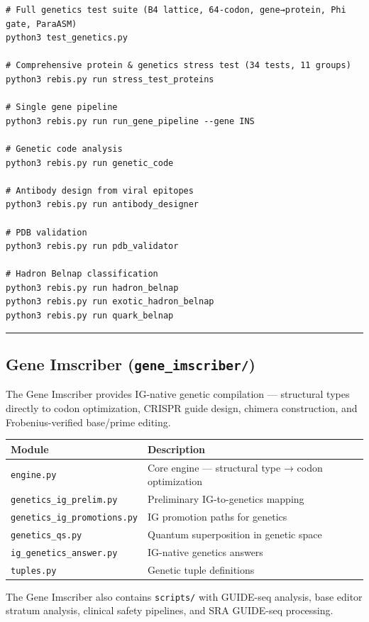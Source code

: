 \documentclass[12pt,a4paper]{article}
\begin{document}
\begin{verbatim}
# Full genetics test suite (B4 lattice, 64-codon, gene→protein, Phi gate, ParaASM)
python3 test_genetics.py

# Comprehensive protein & genetics stress test (34 tests, 11 groups)
python3 rebis.py run stress_test_proteins

# Single gene pipeline
python3 rebis.py run run_gene_pipeline --gene INS

# Genetic code analysis
python3 rebis.py run genetic_code

# Antibody design from viral epitopes
python3 rebis.py run antibody_designer

# PDB validation
python3 rebis.py run pdb_validator

# Hadron Belnap classification
python3 rebis.py run hadron_belnap
python3 rebis.py run exotic_hadron_belnap
python3 rebis.py run quark_belnap
\end{verbatim}

\begin{center}\rule{0.5\linewidth}{0.5pt}\end{center}

\hypertarget{gene-imscriber-gene_imscriber}{%
\subsection{\texorpdfstring{Gene Imscriber
(\texttt{gene\_imscriber/})}{Gene Imscriber (gene\_imscriber/)}}\label{gene-imscriber-gene_imscriber}}

The Gene Imscriber provides IG-native genetic compilation --- structural
types directly to codon optimization, CRISPR guide design, chimera
construction, and Frobenius-verified base/prime editing.

\begin{longtable}[]{@{}ll@{}}
\toprule
Module & Description\tabularnewline
\midrule
\endhead
\texttt{engine.py} & Core engine --- structural type → codon
optimization\tabularnewline
\texttt{genetics\_ig\_prelim.py} & Preliminary IG-to-genetics
mapping\tabularnewline
\texttt{genetics\_ig\_promotions.py} & IG promotion paths for
genetics\tabularnewline
\texttt{genetics\_qs.py} & Quantum superposition in genetic
space\tabularnewline
\texttt{ig\_genetics\_answer.py} & IG-native genetics
answers\tabularnewline
\texttt{tuples.py} & Genetic tuple definitions\tabularnewline
\bottomrule
\end{longtable}

The Gene Imscriber also contains \texttt{scripts/} with GUIDE-seq
analysis, base editor stratum analysis, clinical safety pipelines, and
SRA GUIDE-seq processing.
\end{document}
